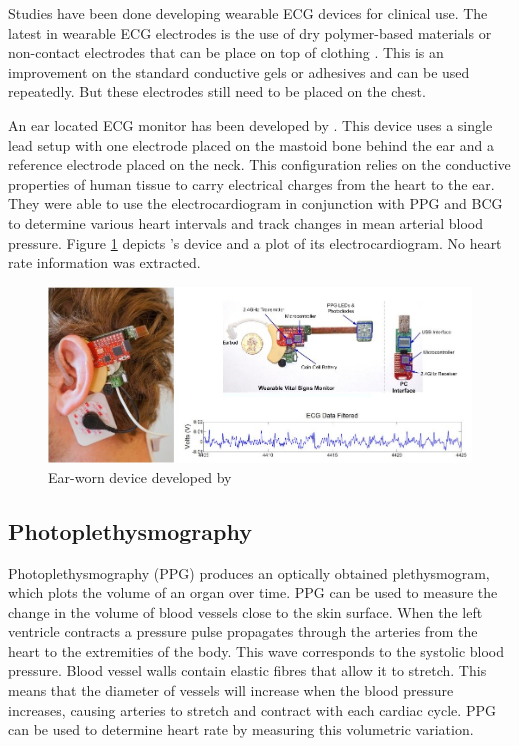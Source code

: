 \medskip
Studies have been done developing wearable ECG devices for clinical use. The latest in wearable ECG electrodes is the use of dry polymer-based materials \citep{wang2010wearable} or non-contact electrodes that can be place on top of clothing \citep{lin2013development}. This is an improvement on the standard conductive gels or adhesives and can be used repeatedly. But these electrodes still need to be placed on the chest.

\medskip
An ear located ECG monitor has been developed by \cite{winokur2012wearable}. This device uses a single lead setup with one electrode placed on the mastoid bone behind the ear and a reference electrode placed on the neck. This configuration relies on the conductive properties of human tissue to carry electrical charges from the heart to the ear. They were able to use the electrocardiogram in conjunction with PPG and BCG to determine various heart intervals and track changes in mean arterial blood pressure. Figure \ref{fig:Winokur} depicts \cite{winokur2012wearable}'s device and a plot of its electrocardiogram. No heart rate information was extracted.

\medskip

\begin{figure}[H]
   \centering
   \includegraphics[scale=1.1]{figs/Winokur}
   \caption{Ear-worn device developed by \cite{winokur2012wearable}}
   \label{fig:Winokur}
\end{figure}

\subsection{Photoplethysmography}
Photoplethysmography (PPG) produces an optically obtained plethysmogram, which plots the volume of an organ over time. PPG can be used to measure the change in the volume of blood vessels close to the skin surface. When the left ventricle contracts a pressure pulse propagates through the arteries from the heart to the extremities of the body. This wave corresponds to the systolic blood pressure. Blood vessel walls contain elastic fibres that allow it to stretch. This means that the diameter of vessels will increase when the blood pressure increases, causing arteries to stretch and contract with each cardiac cycle. PPG can be used to determine heart rate by measuring this volumetric variation.

